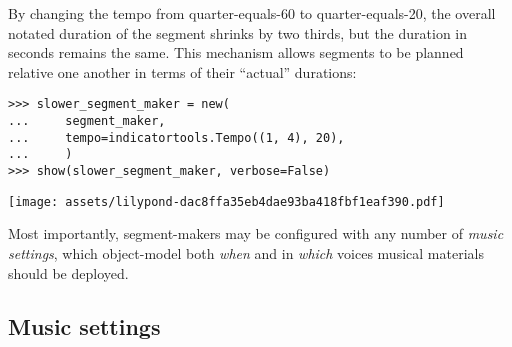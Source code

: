 \noindent By changing the tempo from quarter-equals-60 to quarter-equals-20,
the overall notated duration of the segment shrinks by two thirds, but the
duration in seconds remains the same. This mechanism allows segments to be
planned relative one another in terms of their \enquote{actual} durations:

\begin{comment}
<abjad>[stylesheet=../consort.ily]
slower_segment_maker = new(
    segment_maker,
    tempo=indicatortools.Tempo((1, 4), 20),
    )
show(slower_segment_maker, verbose=False)
</abjad>
\end{comment}

\begin{abjadbookoutput}
\begin{singlespacing}
\vspace{-0.5\baselineskip}
\begin{lstlisting}
>>> slower_segment_maker = new(
...     segment_maker,
...     tempo=indicatortools.Tempo((1, 4), 20),
...     )
>>> show(slower_segment_maker, verbose=False)
\end{lstlisting}
\noindent\texttt{[image: assets/lilypond-dac8ffa35eb4dae93ba418fbf1eaf390.pdf]}
\end{singlespacing}
\end{abjadbookoutput}

\noindent Most importantly, segment-makers may be configured with any number of
\emph{music settings}, which object-model both \emph{when} and in \emph{which}
voices musical materials should be deployed.

\subsection{Music settings}
\label{ssec:music-settings}

